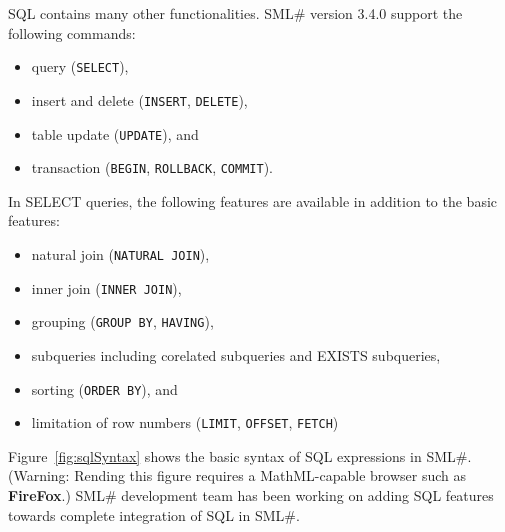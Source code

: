 \documentclass{jbook}
\newcommand{\smlsharp}{SML\#}
\newcommand{\version}{3.4.0}
\begin{document}
\else%
	SQL contains many other functionalities.
	\smlsharp{} version \version{} support the following commands:
\begin{itemize}
\item query ({\tt SELECT}),
\item insert and delete ({\tt INSERT}, {\tt DELETE}),
\item table update ({\tt UPDATE}), and
\item transaction ({\tt BEGIN}, {\tt ROLLBACK}, {\tt COMMIT}).
\end{itemize}
	In SELECT queries,
the following features are available in addition to the basic features:
\begin{itemize}
\item natural join ({\tt NATURAL JOIN}),
\item inner join ({\tt INNER JOIN}),
\item grouping ({\tt GROUP BY}, {\tt HAVING}),
\item subqueries including corelated subqueries and EXISTS subqueries,
\item sorting ({\tt ORDER BY}), and
\item limitation of row numbers ({\tt LIMIT}, {\tt OFFSET}, {\tt FETCH})
\end{itemize}

	Figure~\ref{fig:sqlSyntax} shows the basic syntax of
SQL expressions in \smlsharp{}.
	(Warning: Rending this figure requires a MathML-capable browser such as {\bf FireFox}.)
	\smlsharp{} development team has been working on
adding SQL features towards complete integration of SQL in \smlsharp{}.
\fi%
\end{document}
